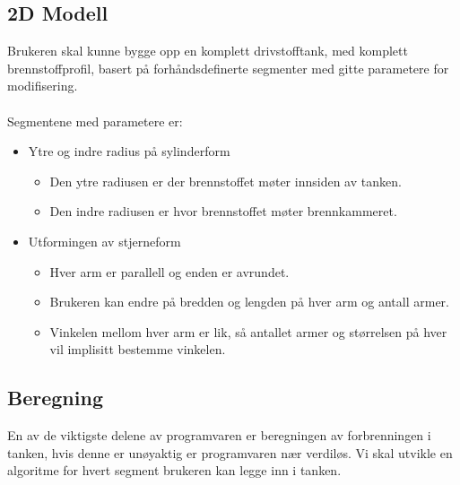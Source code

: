 \subsection{2D Modell} 
Brukeren skal kunne bygge opp en komplett drivstofftank, med komplett brennstoffprofil, basert på forhåndsdefinerte segmenter med gitte parametere for modifisering. \\ \\
Segmentene med parametere er:
\begin{itemize}
    \item Ytre og indre radius på sylinderform
        \begin{itemize}
            \item Den ytre radiusen er der brennstoffet møter innsiden av tanken.
            \item Den indre radiusen er hvor brennstoffet møter brennkammeret.
        \end{itemize}
    \item Utformingen av stjerneform
        \begin{itemize}
            \item Hver arm er parallell og enden er avrundet.
            \item Brukeren kan endre på bredden og lengden på hver arm og antall armer.
            \item Vinkelen mellom hver arm er lik, så antallet armer og størrelsen på hver vil implisitt bestemme vinkelen.
        \end{itemize}
\end{itemize}



	



\subsection{Beregning}
En av de viktigste delene av programvaren er beregningen av forbrenningen i tanken, hvis denne er unøyaktig er programvaren nær verdiløs. Vi skal utvikle en algoritme for hvert segment brukeren kan legge inn i tanken.	\clearpage

